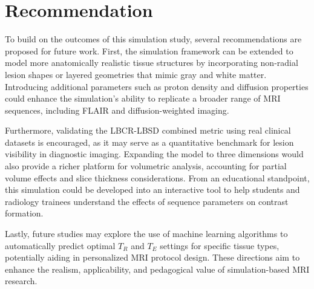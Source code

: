 \documentclass[10pt,a4paper,twoside]{article}
\begin{document}
\section{Recommendation}
To build on the outcomes of this simulation study, several recommendations are proposed for future work. First, the simulation framework can be extended to model more anatomically realistic tissue structures by incorporating non-radial lesion shapes or layered geometries that mimic gray and white matter. Introducing additional parameters such as proton density and diffusion properties could enhance the simulation’s ability to replicate a broader range of MRI sequences, including FLAIR and diffusion-weighted imaging. 

Furthermore, validating the LBCR-LBSD combined metric using real clinical datasets is encouraged, as it may serve as a quantitative benchmark for lesion visibility in diagnostic imaging. Expanding the model to three dimensions would also provide a richer platform for volumetric analysis, accounting for partial volume effects and slice thickness considerations. From an educational standpoint, this simulation could be developed into an interactive tool to help students and radiology trainees understand the effects of sequence parameters on contrast formation. 

Lastly, future studies may explore the use of machine learning algorithms to automatically predict optimal $T_R$ and $T_E$ settings for specific tissue types, potentially aiding in personalized MRI protocol design. These directions aim to enhance the realism, applicability, and pedagogical value of simulation-based MRI research.







\end{document}
